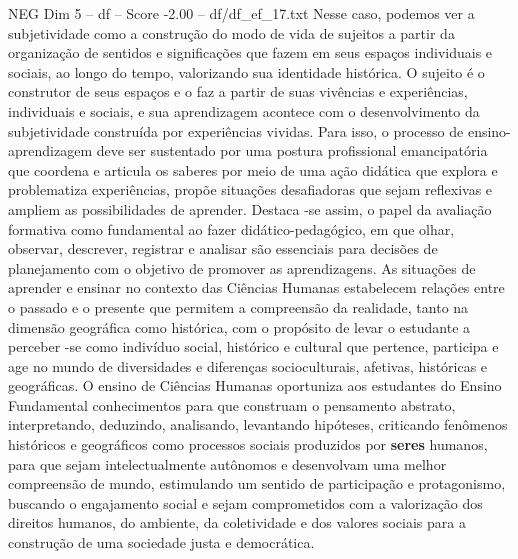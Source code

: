 \begin{textsample}{NEG Dim 5 – df – Score -2.00 – df/df\_ef\_17.txt}
Nesse caso, podemos ver a subjetividade como a construção do modo de vida de sujeitos a partir da organização de sentidos e significações que fazem em seus espaços individuais e sociais, ao longo do tempo, valorizando sua identidade histórica.
O sujeito é o construtor de seus espaços e o faz a partir de suas vivências e experiências, individuais e sociais, e sua aprendizagem acontece com o desenvolvimento da subjetividade construída por experiências vividas.
Para isso, o processo de ensino-aprendizagem deve ser sustentado por uma postura profissional emancipatória que coordena e articula os saberes por meio de uma ação didática que explora e problematiza experiências, propõe situações desafiadoras que sejam reflexivas e ampliem as possibilidades de aprender.
Destaca -se assim, o papel da avaliação formativa como fundamental ao fazer didático-pedagógico, em que olhar, observar, descrever, registrar e analisar são essenciais para decisões de planejamento com o objetivo de promover as aprendizagens.
As situações de aprender e ensinar no contexto das Ciências Humanas estabelecem relações entre o passado e o presente que permitem a compreensão da realidade, tanto na dimensão geográfica como histórica, com o propósito de levar o estudante a perceber -se como indivíduo social, histórico e cultural que pertence, participa e age no mundo de diversidades e diferenças socioculturais, afetivas, históricas e geográficas.
O ensino de Ciências Humanas oportuniza aos estudantes do Ensino Fundamental conhecimentos para que construam o pensamento abstrato, interpretando, deduzindo, analisando, levantando hipóteses, criticando fenômenos históricos e geográficos como processos sociais produzidos por \textbf{seres} humanos, para que sejam intelectualmente autônomos e desenvolvam uma melhor compreensão de mundo, estimulando um sentido de participação e protagonismo, buscando o engajamento social e sejam comprometidos com a valorização dos direitos humanos, do ambiente, da coletividade e dos valores sociais para a construção de uma sociedade justa e democrática.

\end{textsample}
